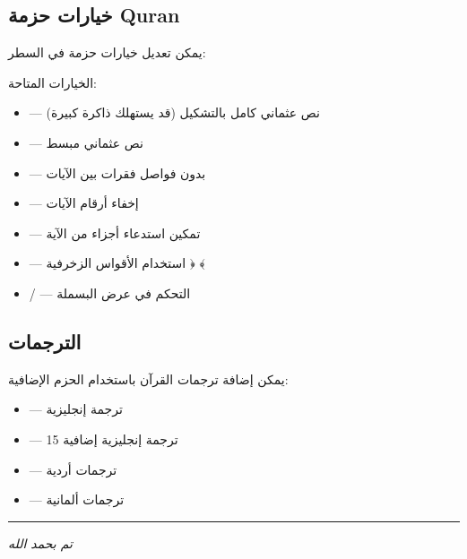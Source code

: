 \documentclass[12pt,a4paper]{article}
\newcommand{\separator}{%
  \begin{center}
    \rule{0.3\textwidth}{0.5pt}
  \end{center}
}
\begin{document}
\subsection{خيارات حزمة Quran}

يمكن تعديل خيارات حزمة  في السطر:

\begin{quote}
\end{quote}

الخيارات المتاحة:

\begin{itemize}[itemsep=0.3em]
  \item {} --- نص عثماني كامل بالتشكيل (قد يستهلك ذاكرة كبيرة)
  \item {} --- نص عثماني مبسط
  \item {} --- بدون فواصل فقرات بين الآيات
  \item {} --- إخفاء أرقام الآيات
  \item {} --- تمكين استدعاء أجزاء من الآية
  \item {} --- استخدام الأقواس الزخرفية ﴿ ﴾
  \item {} /  --- التحكم في عرض البسملة
\end{itemize}

\subsection{الترجمات}

يمكن إضافة ترجمات القرآن باستخدام الحزم الإضافية:

\begin{itemize}[itemsep=0.3em]
  \item {} --- ترجمة إنجليزية
  \item {} --- 15 ترجمة إنجليزية إضافية
  \item {} --- ترجمات أردية
  \item {} --- ترجمات ألمانية
\end{itemize}

\separator

\begin{center}
\textit{تم بحمد الله}
\end{center}
\end{document}
